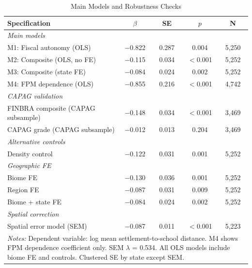 \begin{table}[H]
\centering
\caption{Main Models and Robustness Checks}
\label{tab:robustness}
\begin{tabular}{lcccc}
\toprule
Specification & $\beta$ & SE & $p$ & N \\
\midrule
\textit{Main models} & & & & \\
M1: Fiscal autonomy (OLS) & $-$0.822 & 0.287 & 0.004 & 5,250 \\
M2: Composite (OLS, no FE) & $-$0.115 & 0.034 & $<$0.001 & 5,252 \\
M3: Composite (state FE) & $-$0.084 & 0.024 & 0.002 & 5,252 \\
M4: FPM dependence (OLS) & $-$0.855 & 0.216 & $<$0.001 & 4,742 \\
\midrule
\textit{CAPAG validation} & & & & \\
FINBRA composite (CAPAG subsample) & $-$0.148 & 0.034 & $<$0.001 & 3,469 \\
CAPAG grade (CAPAG subsample) & $-$0.012 & 0.013 & 0.204 & 3,469 \\
\midrule
\textit{Alternative controls} & & & & \\
Density control & $-$0.122 & 0.031 & 0.001 & 5,252 \\
\midrule
\textit{Geographic FE} & & & & \\
Biome FE & $-$0.130 & 0.036 & 0.001 & 5,252 \\
Region FE & $-$0.087 & 0.031 & 0.009 & 5,252 \\
Biome + state FE & $-$0.084 & 0.024 & 0.002 & 5,252 \\
\midrule
\textit{Spatial correction} & & & & \\
Spatial error model (SEM) & $-$0.087 & 0.011 & $<$0.001 & 5,223 \\
\bottomrule
\multicolumn{5}{p{12cm}}{\footnotesize \textit{Notes:} Dependent variable: log mean settlement-to-school distance. M4 shows FPM dependence coefficient only. SEM $\lambda$ = 0.534. All OLS models include biome FE and controls. Clustered SE by state except SEM.} \\
\end{tabular}
\end{table}
